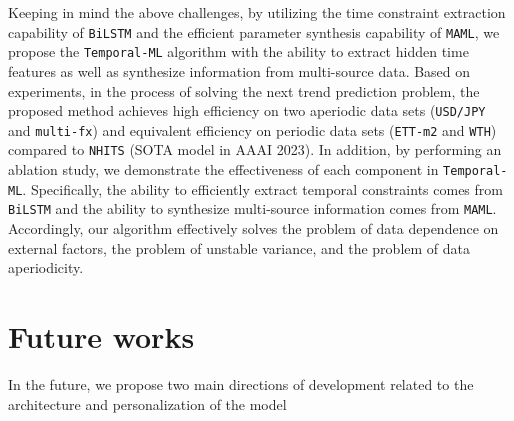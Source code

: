 
Keeping in mind the above challenges, by utilizing the time constraint extraction capability of \verb|BiLSTM| and the efficient parameter synthesis capability of \verb|MAML|, we propose the \verb|Temporal-ML| algorithm with the ability to extract hidden time features as well as synthesize information from multi-source data. Based on experiments, in the process of solving the next trend prediction problem, the proposed method achieves high efficiency on two aperiodic data sets (\verb|USD/JPY| and \verb|multi-fx|) and equivalent efficiency on periodic data sets (\verb|ETT-m2| and \verb|WTH|) compared to \verb|NHITS| (SOTA model in AAAI 2023). In addition, by performing an ablation study, we demonstrate the effectiveness of each component in \verb|Temporal-ML|. Specifically, the ability to efficiently extract temporal constraints comes from \verb|BiLSTM| and the ability to synthesize multi-source information comes from \verb|MAML|. Accordingly, our algorithm effectively solves the problem of data dependence on external factors, the problem of unstable variance, and the problem of data aperiodicity.

\section{Future works}

In the future, we propose two main directions of development related to the architecture and personalization of the model

